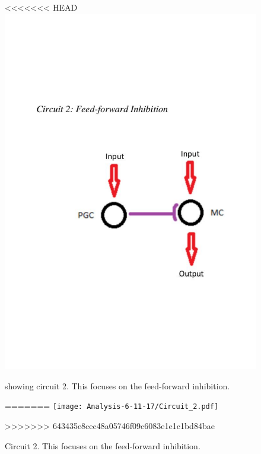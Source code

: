 \documentclass[11pt]{report}
\begin{document}
\begin{figure}[!h]
\centering
<<<<<<< HEAD
\includegraphics[trim={0 6cm 0 6cm},clip, scale=0.5]{images/2017-11-06/Circuit_2.pdf}
\caption{showing circuit 2. This focuses on the feed-forward inhibition.}
=======
\texttt{[image: Analysis-6-11-17/Circuit\_2.pdf]}
\caption{Circuit 2. This focuses on the feed-forward inhibition.}
>>>>>>> 643435e8cec48a05746f09c6083e1e1c1bd84bae
\end{figure} 
\newpage
\end{document}
